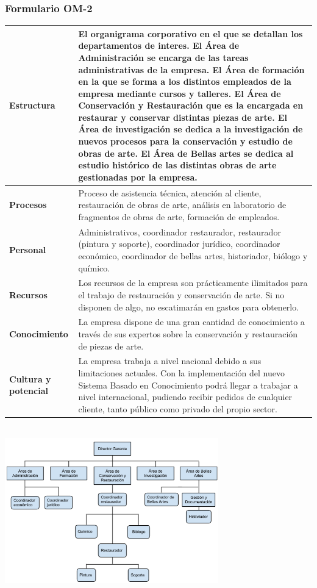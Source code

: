 \documentclass[a4paper,11pt]{article}
\begin{document}
			\subsubsection{Formulario OM-2}
			\begin{center}
				\begin{tabular}{| p{2.5cm} | p{9cm} |}
					\hline
					\textbf{Estructura} & El organigrama corporativo en el que se detallan los
					departamentos de interes. El Área de Administración se encarga de las tareas administrativas de la empresa. El Área de formación en la que se forma a los distintos empleados de la empresa mediante cursos y talleres. El Área de Conservación y Restauración que es la encargada en restaurar y conservar distintas piezas de arte. El Área de investigación se dedica a la investigación de nuevos procesos para la conservación y estudio de obras de arte. El Área de Bellas artes se dedica al estudio histórico de las distintas obras de arte gestionadas por la empresa.\\
					\hline
					\textbf{Procesos} & Proceso de asistencia técnica, atención al cliente,
					restauración de obras de arte, análisis en laboratorio de fragmentos de obras de arte, formación de empleados.\\
					\hline
					\textbf{Personal} & Administrativos, coordinador restaurador, restaurador
					(pintura y soporte), coordinador jurídico, coordinador económico, coordinador de bellas artes, historiador, biólogo y químico.\\
					\hline
					\textbf{Recursos} & Los recursos de la empresa son prácticamente ilimitados
					para el trabajo de restauración y conservación de arte. Si no disponen de algo, no escatimarán en gastos para obtenerlo.\\
					\hline
					\textbf{Conocimiento} & La empresa dispone de una gran cantidad de
					conocimiento a través de sus expertos sobre la conservación y restauración de piezas de arte.\\
					\hline
					\textbf{Cultura y potencial} & La empresa trabaja a nivel nacional debido a
					sus limitaciones actuales. Con la implementación del nuevo Sistema Basado en Conocimiento podrá llegar a trabajar a nivel internacional, pudiendo recibir pedidos de cualquier cliente, tanto público como privado del propio sector.\\
					\hline
				\end{tabular}\\
				\newpage
				\includegraphics[width=350px]{organigrama.png} \\
			\end{center}
\end{document}
